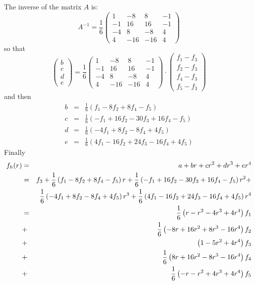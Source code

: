 The inverse of the matrix $A$ is:
\[
A^{-1}=
\frac{1}{6}
\left(
\begin{array}{ccccc}
1 & -8 & 8 & -1 \\
-1 & 16 & 16 & -1 \\
-4 & 8 & -8 & 4 \\
4 & -16 & -16 & 4
\end{array}
\right)
\]
so that 
\[
\left(
\begin{array}{c}
b \\ c \\ d \\ e
\end{array}
\right)
=
\frac{1}{6}
\left(
\begin{array}{ccccc}
1 & -8 & 8 & -1 \\
-1 & 16 & 16 & -1 \\
-4 & 8 & -8 & 4 \\
4 & -16 & -16 & 4
\end{array}
\right)
\cdot
\left(
\begin{array}{c}
f_1 -f_3 \\ f_2 -f_3\\ f_4-f_3 \\ f_5 -f_3
\end{array}
\right)
\]
and then 
\begin{eqnarray}
b &=& \frac{1}{6} \left( f_1 -8f_2 +8 f_4 -f_5     \right) \\
c &=& \frac{1}{6} \left( -f_1 +16f_2 -30f_3    + 16f_4- f_5   \right) \\
d &=& \frac{1}{6} \left( -4f_1 +8f_2     -8f_4+ 4 f_5   \right) \\
e &=& \frac{1}{6} \left( 4f_1 -16f_2 +24f_3 -16f_4+ 4 f_5   \right) 
\end{eqnarray}
Finally
\begin{eqnarray}
f_h(r) 
&=& a+br+cr^2+dr^3+er^4 \nonumber\\
&=& f_3 + 
\frac{1}{6} \left( f_1 -8f_2 +8 f_4 -f_5     \right)  r  +
\frac{1}{6} \left( -f_1 +16f_2 -30f_3    + 16f_4- f_5   \right) r^2 + \nonumber\\ &&
\frac{1}{6} \left( -4f_1 +8f_2     -8f_4+ 4 f_5   \right) r^3 +
\frac{1}{6} \left( 4f_1 -16f_2 +24f_3 -16f_4+ 4 f_5   \right) r^4 \nonumber\\
&=& \frac{1}{6} \left(  r- r^2 -4r^3 +4r^4\right) f_1 \nonumber\\
&+& \frac{1}{6} \left(  -8r+16 r^2 +8r^3 -16 r^4\right) f_2 \nonumber\\
&+& \left( 1 -5r^2+4r^4  \right) f_3 \nonumber\\
&+& \frac{1}{6} \left(  8r+16 r^2 -8r^3 -16 r^4\right) f_4 \nonumber\\
&+& \frac{1}{6} \left(  -r- r^2 +4r^3 +4r^4\right) f_5 \nonumber
\end{eqnarray}
